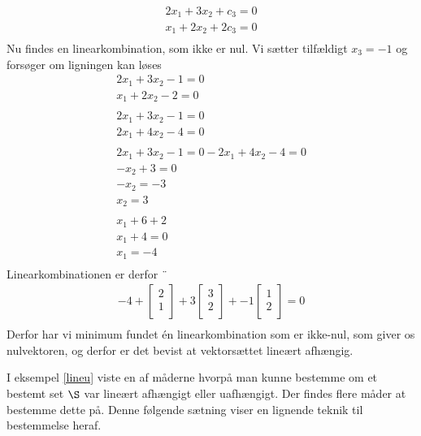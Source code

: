 \begin{eks}
\begin{align*}
2x_1+3x_2+c_3=0\\
x_1+2x_2+2c_3=0 \\
\end{align*}
\noindent
Nu findes en linearkombination, som ikke er nul. Vi sætter tilfældigt $x_3 = -1$ og forsøger om ligningen kan løses
\begin{align*}
2x_1+3x_2-1=0\\
x_1+2x_2-2=0\\
\\
2x_1+3x_2-1=0\\
2x_1+4x_2-4=0\\
\\	 
2x_1+3x_2-1=0 - 2x_1+4x_2-4=0 \\
-x_2+3=0\\
-x_2=-3\\
x_2=3\\
\\
x_1+6+2\\
x_1+4=0\\
x_1=-4\\
\end{align*}
Linearkombinationen er derfor ¨
\begin{align*}
-4+
\begin{bmatrix}
           2 \\
           1 \\
\end{bmatrix}
+ 3
\begin{bmatrix}
           3 \\
           2 \\
\end{bmatrix}
+ -1
\begin{bmatrix}
           1 \\
           2 \\
\end{bmatrix}
=0 \\
\end{align*}
Derfor har vi minimum fundet én linearkombination som er ikke-nul, som giver os nulvektoren, og derfor er det bevist at vektorsættet lineært afhængig.
\end{eks}
I eksempel \ref{lineu} viste en af måderne hvorpå man kunne bestemme om et bestemt set $\S$ var lineært afhængigt eller uafhængigt. Der findes flere måder at bestemme dette på. Denne følgende sætning viser en lignende teknik til bestemmelse heraf. 

